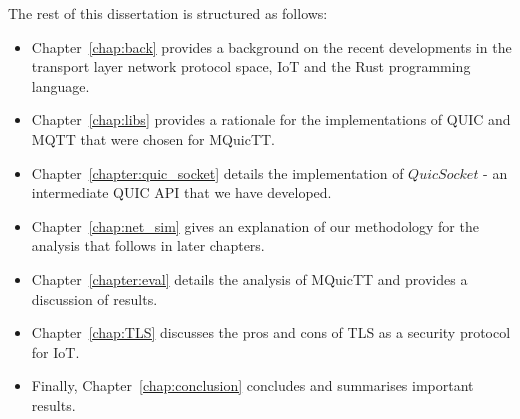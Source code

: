 The rest of this dissertation is structured as follows:
\begin{itemize}
    \item Chapter~\ref{chap:back} provides a background on the recent developments in the transport layer network protocol space, IoT and the Rust programming language.
    \item Chapter~\ref{chap:libs} provides a rationale for the implementations of QUIC and MQTT that were chosen for MQuicTT.
    \item Chapter~\ref{chapter:quic_socket} details the implementation of $QuicSocket$ - an intermediate QUIC API that we have developed.
    \item Chapter~\ref{chap:net_sim} gives an explanation of our methodology for the analysis that follows in later chapters.
    \item Chapter~\ref{chapter:eval} details the analysis of MQuicTT and provides a discussion of results.
    \item Chapter~\ref{chap:TLS} discusses the pros and cons of TLS as a security protocol for IoT.
    \item Finally, Chapter~\ref{chap:conclusion} concludes and summarises important results.
\end{itemize}